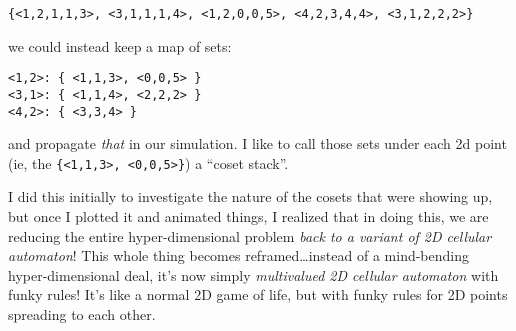 \documentclass[]{article}
\begin{document}
\begin{verbatim}
{<1,2,1,1,3>, <3,1,1,1,4>, <1,2,0,0,5>, <4,2,3,4,4>, <3,1,2,2,2>}
\end{verbatim}

we could instead keep a map of sets:

\begin{verbatim}
<1,2>: { <1,1,3>, <0,0,5> }
<3,1>: { <1,1,4>, <2,2,2> }
<4,2>: { <3,3,4> }
\end{verbatim}

and propagate \emph{that} in our simulation. I like to call those sets under
each 2d point (ie, the
\texttt{\{\textless{}1,1,3\textgreater{},\ \textless{}0,0,5\textgreater{}\}}) a
``coset stack''.

I did this initially to investigate the nature of the cosets that were showing
up, but once I plotted it and animated things, I realized that in doing this, we
are reducing the entire hyper-dimensional problem \emph{back to a variant of 2D
cellular automaton}! This whole thing becomes reframed\ldots instead of a
mind-bending hyper-dimensional deal, it's now simply \emph{multivalued 2D
cellular automaton} with funky rules! It's like a normal 2D game of life, but
with funky rules for 2D points spreading to each other.
\end{document}
